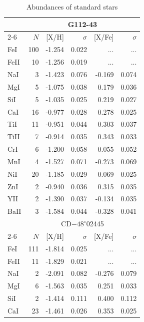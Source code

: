 \documentclass{aa}
\begin{document}
\begin{table}
\caption{Abundances of standard stars \label{tab:abundance_standard}}
\centering
\begin{tabular}{l*{5}{r}}
\hline\hline
     &                     \multicolumn{5}{c}{G112-43   }\\\cline{2-6}
     & $N$ & [{X}/{H}] & $\sigma$ & [{X}/{Fe}] & $\sigma$\\\hline
FeI  &    100&    -1.254&     0.022&       ...&       ...\\
FeII &     10&    -1.256&     0.019&       ...&       ...\\
NaI  &      3&    -1.423&     0.076&    -0.169&     0.074\\
MgI  &      5&    -1.075&     0.038&     0.179&     0.036\\
SiI  &      5&    -1.035&     0.025&     0.219&     0.027\\
CaI  &     16&    -0.977&     0.028&     0.278&     0.025\\
TiI  &     11&    -0.951&     0.044&     0.303&     0.037\\
TiII &      7&    -0.914&     0.035&     0.343&     0.033\\
CrI  &      6&    -1.200&     0.058&     0.055&     0.052\\
MnI  &      4&    -1.527&     0.071&    -0.273&     0.069\\
NiI  &     20&    -1.185&     0.029&     0.069&     0.025\\
ZnI  &      2&    -0.940&     0.036&     0.315&     0.035\\
YII  &      2&    -1.390&     0.037&    -0.134&     0.035\\
BaII &      3&    -1.584&     0.044&    -0.328&     0.041\\\hline\hline
     &                     \multicolumn{5}{c}{CD$-48^{\circ}$02445}\\\cline{2-6}
     & $N$ & [{X}/{H}] & $\sigma$ & [{X}/{Fe}] & $\sigma$\\\hline
FeI  &    111&    -1.814&     0.025&       ...&       ...\\
FeII &     11&    -1.829&     0.021&       ...&       ...\\
NaI  &      2&    -2.091&     0.082&    -0.276&     0.079\\
MgI  &      6&    -1.563&     0.035&     0.251&     0.033\\
SiI  &      2&    -1.414&     0.111&     0.400&     0.112\\
CaI  &     23&    -1.461&     0.026&     0.353&     0.025\\

\end{tabular}
\end{table}
\end{document}
